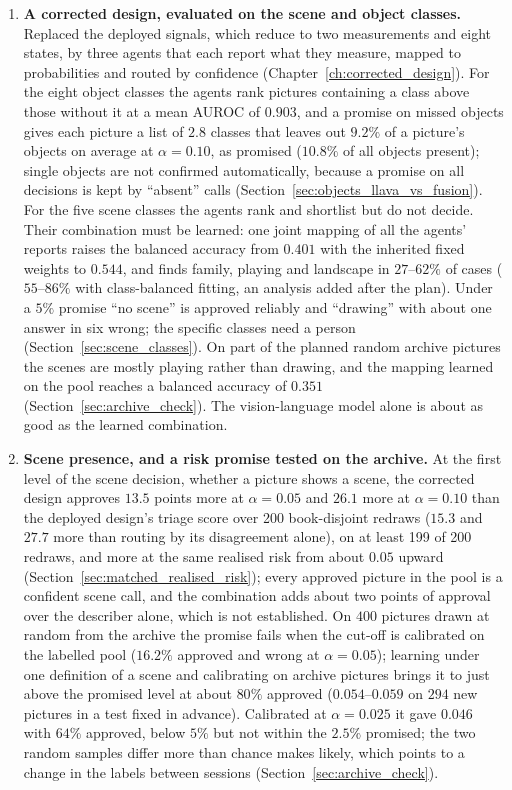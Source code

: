 \documentclass[12pt,a4paper]{report}
\begin{document}
\begin{enumerate}
    \item \textbf{A corrected design, evaluated on the scene and object classes.} Replaced the deployed signals, which reduce to two measurements and eight states, by three agents that each report what they measure, mapped to probabilities and routed by confidence (Chapter~\ref{ch:corrected_design}). For the eight object classes the agents rank pictures containing a class above those without it at a mean AUROC of $0.903$, and a promise on missed objects gives each picture a list of $2.8$ classes that leaves out $9.2\%$ of a picture's objects on average at $\alpha = 0.10$, as promised ($10.8\%$ of all objects present); single objects are not confirmed automatically, because a promise on all decisions is kept by ``absent'' calls (Section~\ref{sec:objects_llava_vs_fusion}). For the five scene classes the agents rank and shortlist but do not decide. Their combination must be learned: one joint mapping of all the agents' reports raises the balanced accuracy from $0.401$ with the inherited fixed weights to $0.544$, and finds family, playing and landscape in $27$--$62\%$ of cases ($55$--$86\%$ with class-balanced fitting, an analysis added after the plan). Under a $5\%$ promise ``no scene'' is approved reliably and ``drawing'' with about one answer in six wrong; the specific classes need a person (Section~\ref{sec:scene_classes}). On part of the planned random archive pictures the scenes are mostly playing rather than drawing, and the mapping learned on the pool reaches a balanced accuracy of $0.351$ (Section~\ref{sec:archive_check}). The vision-language model alone is about as good as the learned combination.
    \item \textbf{Scene presence, and a risk promise tested on the archive.} At the first level of the scene decision, whether a picture shows a scene, the corrected design approves $13.5$ points more at $\alpha=0.05$ and $26.1$ more at $\alpha=0.10$ than the deployed design's triage score over 200 book-disjoint redraws ($15.3$ and $27.7$ more than routing by its disagreement alone), on at least 199 of 200 redraws, and more at the same realised risk from about $0.05$ upward (Section~\ref{sec:matched_realised_risk}); every approved picture in the pool is a confident scene call, and the combination adds about two points of approval over the describer alone, which is not established. On $400$ pictures drawn at random from the archive the promise fails when the cut-off is calibrated on the labelled pool ($16.2\%$ approved and wrong at $\alpha=0.05$); learning under one definition of a scene and calibrating on archive pictures brings it to just above the promised level at about $80\%$ approved ($0.054$--$0.059$ on $294$ new pictures in a test fixed in advance). Calibrated at $\alpha=0.025$ it gave $0.046$ with $64\%$ approved, below $5\%$ but not within the $2.5\%$ promised; the two random samples differ more than chance makes likely, which points to a change in the labels between sessions (Section~\ref{sec:archive_check}).

\end{enumerate}
\end{document}
